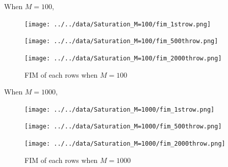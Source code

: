 \documentclass[
]{article}
\begin{document}
When \(M=100\),

\begin{figure}

\begin{minipage}{0.33\linewidth}

\texttt{[image: ../../data/Saturation\_M=100/fim\_1strow.png]}

\end{minipage}%
%
\begin{minipage}{0.33\linewidth}

\texttt{[image: ../../data/Saturation\_M=100/fim\_500throw.png]}

\end{minipage}%
%
\begin{minipage}{0.33\linewidth}

\texttt{[image: ../../data/Saturation\_M=100/fim\_2000throw.png]}

\end{minipage}%

\caption{\label{fig-eig1000}FIM of each rows when \(M=100\)}

\end{figure}%

When \(M=1000\),

\begin{figure}

\begin{minipage}{0.33\linewidth}

\texttt{[image: ../../data/Saturation\_M=1000/fim\_1strow.png]}

\end{minipage}%
%
\begin{minipage}{0.33\linewidth}

\texttt{[image: ../../data/Saturation\_M=1000/fim\_500throw.png]}

\end{minipage}%
%
\begin{minipage}{0.33\linewidth}

\texttt{[image: ../../data/Saturation\_M=1000/fim\_2000throw.png]}

\end{minipage}%

\caption{\label{fig-eig1000}FIM of each rows when \(M=1000\)}

\end{figure}%
\end{document}
